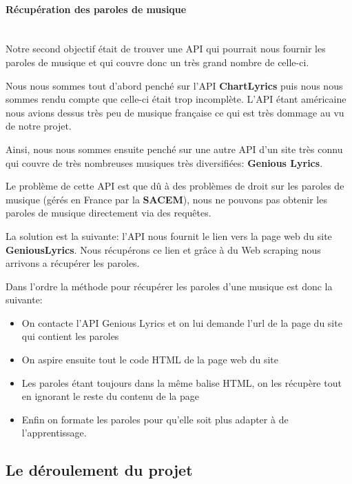 \documentclass[12pt,french]{article}
\begin{document}
\paragraph{Récupération des paroles de musique \\\\}

Notre second objectif était de trouver une API qui pourrait nous fournir les paroles de musique et qui couvre donc un très grand nombre de celle-ci.

\medskip

Nous nous sommes tout d'abord penché sur l'API \textbf{ChartLyrics} puis nous nous sommes rendu compte que celle-ci était trop incomplète. L'API étant américaine nous avions dessus très peu de musique française ce qui est très dommage au vu de notre projet.

\medskip

Ainsi, nous nous sommes ensuite penché sur une autre API d'un site très connu qui couvre de très nombreuses musiques très diversifiées: \textbf{Genious Lyrics}.

Le problème de cette API est que dû à des problèmes de droit sur les paroles de musique (gérés en France par la \textbf{SACEM}), nous ne pouvons pas obtenir les paroles de musique directement via des requêtes.

La solution est la suivante: l'API nous fournit le lien vers la page web du site \textbf{GeniousLyrics}. Nous récupérons ce lien et grâce à du Web scraping nous arrivons a récupérer les paroles.

Dans l'ordre la méthode pour récupérer les paroles d'une musique est donc la suivante: 

\medskip

\begin{itemize}
	\item On contacte l'API Genious Lyrics et on lui demande l'url de la page du site qui contient les paroles
	\item On aspire ensuite tout le code HTML de la page web du site
	\item Les paroles étant toujours dans la même balise HTML, on les récupère tout en ignorant le reste du contenu de la page
	\item Enfin on formate les paroles pour qu'elle soit plus adapter à de l'apprentissage.
\end{itemize}

\medskip

\subsection{Le déroulement du projet}
\end{document}
